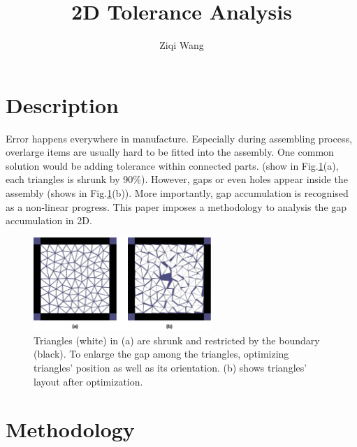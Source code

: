 \documentclass[12pt]{article}
\title{2D Tolerance Analysis}
\author{Ziqi Wang}
\date{} %
\begin{document}
\maketitle
\section{Description}
Error happens everywhere in manufacture. Especially during assembling process, overlarge items are usually hard to be fitted into the assembly. One common solution would be adding tolerance within connected parts. (show in Fig.\ref{fig:tolerance_holes}(a), each triangles is shrunk by 90\%). However, gaps or even holes appear inside the assembly (shows in Fig.\ref{fig:tolerance_holes}(b)). More importantly, gap accumulation is recognised as a non-linear progress. This paper imposes a methodology to analysis the gap accumulation in 2D.
\begin{figure}[!htbp]
  \centering
    \includegraphics[width=0.6\textwidth]{ppt/tolerance_holes.png}
      \caption{Triangles (white) in (a) are shrunk and restricted by the boundary (black). To enlarge the gap among the triangles, optimizing triangles' position as well as its orientation. (b) shows triangles' layout after optimization. }
      \label{fig:tolerance_holes}
\end{figure}
\section{Methodology}
\end{document}
